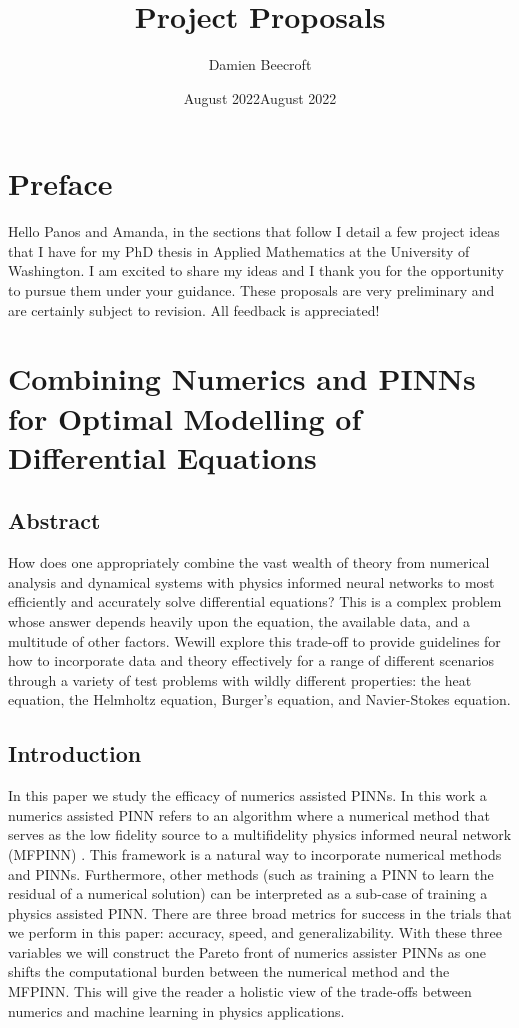\documentclass[12pt]{article}
\date{August 2022}
\title{Project Proposals}
\author{Damien Beecroft}
\date{August 2022}
\begin{document}
\maketitle
\section{Preface}

Hello Panos and Amanda, in the sections that follow I detail a few project ideas that I have for my PhD thesis in Applied Mathematics at the University of Washington. I am excited to share my ideas and I thank you for the opportunity to pursue them under your guidance. These proposals are very preliminary and are certainly subject to revision. All feedback is appreciated!

\section{Combining Numerics and PINNs for Optimal Modelling of Differential Equations}
\subsection{Abstract}
How does one appropriately combine the vast wealth of theory from numerical analysis and dynamical systems with physics informed neural networks to most efficiently and accurately solve differential equations? This is a complex problem whose answer depends heavily upon the equation, the available data, and a multitude of other factors. Wewill explore this trade-off to provide guidelines for how to incorporate data and theory effectively for a range of different scenarios through a variety of test problems with wildly different properties: the heat equation, the Helmholtz equation, Burger's equation, and Navier-Stokes equation.

\subsection{Introduction}
In this paper we study the efficacy of numerics assisted PINNs. In this work a numerics assisted PINN refers to 
an algorithm where a numerical method that serves as the low fidelity source to a multifidelity physics informed neural network (MFPINN) \cite{mfpinns}.
This framework is a natural way to incorporate numerical methods and PINNs. Furthermore, other methods (such as training a PINN to 
learn the residual of a numerical solution) can be interpreted as a sub-case of training a physics assisted PINN.
There are three broad metrics for success in the trials that we perform in this paper: accuracy, speed, and generalizability.
With these three variables we will construct the Pareto front of numerics assister PINNs as one shifts the computational burden between
the numerical method and the MFPINN. This will give the reader a holistic view of the trade-offs between numerics and machine learning
in physics applications.
\end{document}
